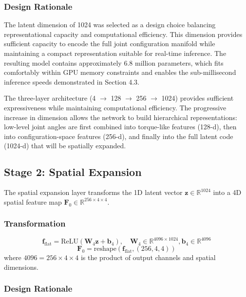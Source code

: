 \documentclass[12pt,a4paper,oneside]{report}
\begin{document}
\subsubsection{Design Rationale}

The latent dimension of 1024 was selected as a design choice balancing representational capacity and computational efficiency. This dimension provides sufficient capacity to encode the full joint configuration manifold while maintaining a compact representation suitable for real-time inference. The resulting model contains approximately 6.8 million parameters, which fits comfortably within GPU memory constraints and enables the sub-millisecond inference speeds demonstrated in Section 4.3.

The three-layer architecture (4 $\rightarrow$ 128 $\rightarrow$ 256 $\rightarrow$ 1024) provides sufficient expressiveness while maintaining computational efficiency. The progressive increase in dimension allows the network to build hierarchical representations: low-level joint angles are first combined into torque-like features (128-d), then into configuration-space features (256-d), and finally into the full latent code (1024-d) that will be spatially expanded.

\subsection{Stage 2: Spatial Expansion}

The spatial expansion layer transforms the 1D latent vector $\mathbf{z} \in \mathbb{R}^{1024}$ into a 4D spatial feature map $\mathbf{F}_0 \in \mathbb{R}^{256 \times 4 \times 4}$.

\subsubsection{Transformation}

\begin{equation}
\mathbf{f}_{\text{flat}} = \text{ReLU}(\mathbf{W}_4 \mathbf{z} + \mathbf{b}_4), \quad \mathbf{W}_4 \in \mathbb{R}^{4096 \times 1024}, \mathbf{b}_4 \in \mathbb{R}^{4096}
\end{equation}
\begin{equation}
\mathbf{F}_0 = \text{reshape}(\mathbf{f}_{\text{flat}}, (256, 4, 4))
\end{equation}
where $4096 = 256 \times 4 \times 4$ is the product of output channels and spatial dimensions.

\subsubsection{Design Rationale}
\end{document}
